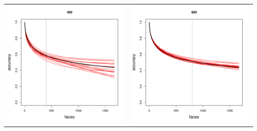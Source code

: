 \documentclass{beamer}
\begin{document}
\begin{frame}
\begin{center}
\begin{tabular}{cc}
\includegraphics[scale = 0.2]{../facerec/sub_400.pdf} &
\includegraphics[scale = 0.2]{../facerec/sub_800.pdf}
\end{tabular}
\end{center}
\end{frame}
\end{document}
